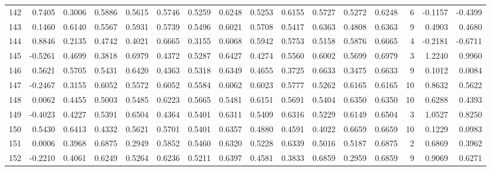\begin{tabular}{lrrrrrrrrrrrrrrr}
142 &      0.7405 &  0.3006 &  0.5886 &  0.5615 &  0.5746 &  0.5259 &  0.6248 &  0.5253 &  0.6155 &  0.5727 &   0.5272 &     0.6248 &      6 &                   -0.1157 &                    -0.4399 \\
143 &      0.1460 &  0.6140 &  0.5567 &  0.5931 &  0.5739 &  0.5496 &  0.6021 &  0.5708 &  0.5417 &  0.6363 &   0.4808 &     0.6363 &      9 &                    0.4903 &                     0.4680 \\
144 &      0.8846 &  0.2135 &  0.4742 &  0.4021 &  0.6665 &  0.3155 &  0.6068 &  0.5942 &  0.5753 &  0.5158 &   0.5876 &     0.6665 &      4 &                   -0.2181 &                    -0.6711 \\
145 &     -0.5261 &  0.4699 &  0.3818 &  0.6979 &  0.4372 &  0.5287 &  0.6427 &  0.4274 &  0.5560 &  0.6002 &   0.5699 &     0.6979 &      3 &                    1.2240 &                     0.9960 \\
146 &      0.5621 &  0.5705 &  0.5431 &  0.6420 &  0.4363 &  0.5318 &  0.6349 &  0.4655 &  0.3725 &  0.6633 &   0.3475 &     0.6633 &      9 &                    0.1012 &                     0.0084 \\
147 &     -0.2467 &  0.3155 &  0.6052 &  0.5572 &  0.6052 &  0.5584 &  0.6062 &  0.6023 &  0.5777 &  0.5262 &   0.6165 &     0.6165 &     10 &                    0.8632 &                     0.5622 \\
148 &      0.0062 &  0.4455 &  0.5003 &  0.5485 &  0.6223 &  0.5665 &  0.5481 &  0.6151 &  0.5691 &  0.5404 &   0.6350 &     0.6350 &     10 &                    0.6288 &                     0.4393 \\
149 &     -0.4023 &  0.4227 &  0.5391 &  0.6504 &  0.4364 &  0.5401 &  0.6311 &  0.5409 &  0.6316 &  0.5229 &   0.6149 &     0.6504 &      3 &                    1.0527 &                     0.8250 \\
150 &      0.5430 &  0.6413 &  0.4332 &  0.5621 &  0.5701 &  0.5401 &  0.6357 &  0.4880 &  0.4591 &  0.4022 &   0.6659 &     0.6659 &     10 &                    0.1229 &                     0.0983 \\
151 &      0.0006 &  0.3968 &  0.6875 &  0.2949 &  0.5852 &  0.5460 &  0.6320 &  0.5228 &  0.6339 &  0.5016 &   0.5187 &     0.6875 &      2 &                    0.6869 &                     0.3962 \\
152 &     -0.2210 &  0.4061 &  0.6249 &  0.5264 &  0.6236 &  0.5211 &  0.6397 &  0.4581 &  0.3833 &  0.6859 &   0.2959 &     0.6859 &      9 &                    0.9069 &                     0.6271 \\

\end{tabular}
